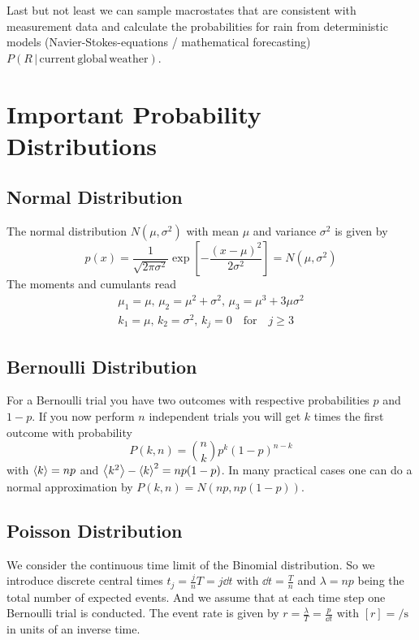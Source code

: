 \documentclass{notebook}
\begin{document}
Last but not least we can sample macrostates that are consistent with measurement data and calculate the probabilities for rain from deterministic models (Navier-Stokes-equations / mathematical forecasting) $P(R \, | \, \mathrm{current \, global \, weather})$.

\section{Important Probability Distributions}

\subsection*{Normal Distribution}

The normal distribution $N(\mu, \sigma^2)$ with mean $\mu$ and variance $\sigma^2$ is given by
%
\begin{equation}
p(x) = \frac{1}{\sqrt{2 \pi \sigma^2}} \exp[- \frac{(x- \mu)^2}{2 \sigma^2}] = N(\mu, \sigma^2)
\end{equation}
%
The moments and cumulants read
%
\begin{gather*}
	\mu_1 = \mu, \, \mu_2 = \mu^2 + \sigma^2, \, \mu_3 = \mu^3 + 3 \mu \sigma^2 \\
	k_1 = \mu, \, k_2 = \sigma^2, \, k_j = 0 \quad \mathrm{for} \quad j \geq 3
\end{gather*}
%

\subsection*{Bernoulli Distribution}

For a Bernoulli trial you have two outcomes with respective probabilities $p$ and $1 - p$. If you now perform $n$ independent trials you will get $k$ times the first outcome with probability
%
\begin{equation}
P(k,n) = \binom{n}{k} p^k (1 - p)^{n - k}
\end{equation}
%
with $\expval{k} = n p$ and $\expval{k^2} - \expval{k}^2 = n p (1 - p)$. In many practical cases one can do a normal approximation by $P(k,n) = N(np, n p (1 - p))$.

\subsection*{Poisson Distribution}

We consider the continuous time limit of the Binomial distribution. So we introduce discrete central times $t_j = \frac{j}{n} T = j \dd{t}$ with $\dd{t} = \frac{T}{n}$ and $\lambda = np$ being the total number of expected events. And we assume that at each time step one Bernoulli trial is conducted. The event rate is given by $r = \frac{\lambda}{T} = \frac{p}{\dd{t}}$ with $[r] = \si{\per \second}$ in units of an inverse time. 
\end{document}
